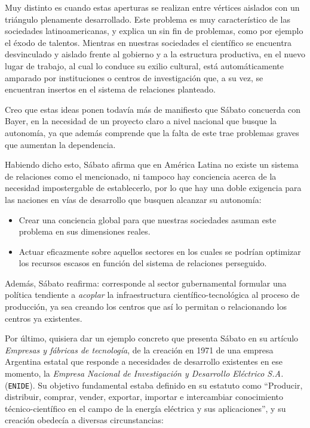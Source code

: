 Muy distinto es cuando estas aperturas se realizan entre vértices aislados con un triángulo plenamente desarrollado. Este problema es muy característico de las sociedades latinoamericanas, y explica un sin fin de problemas, como por ejemplo el éxodo de talentos. Mientras en nuestras sociedades el científico se encuentra desvinculado y aislado frente al gobierno y a la estructura productiva, en el nuevo lugar de trabajo, al cual lo conduce su exilio cultural, está automáticamente amparado por instituciones o centros de investigación que, a su vez, se encuentran insertos en el sistema de relaciones planteado.

Creo que estas ideas ponen todavía más de manifiesto que Sábato concuerda con Bayer, en la necesidad de un proyecto claro a nivel nacional que busque la autonomía, ya que además comprende que la falta de este trae problemas graves que aumentan la dependencia.

\vspace{0.5em}

Habiendo dicho esto, Sábato afirma que en América Latina no existe un sistema de relaciones como el mencionado, ni tampoco hay conciencia acerca de la necesidad impostergable de establecerlo, por lo que hay una doble exigencia para las naciones en vías de desarrollo que busquen alcanzar su autonomía:
\begin{itemize}
    \item Crear una conciencia global para que nuestras sociedades asuman este problema en sus dimensiones reales.
    \item Actuar eficazmente sobre aquellos sectores en los cuales se podrían optimizar los recursos escasos en función del sistema de relaciones perseguido.
\end{itemize}

Además, Sábato reafirma: corresponde al sector gubernamental formular una política tendiente a \textit{acoplar} la infraestructura científico-tecnológica al proceso de producción, ya sea creando los centros que así lo permitan o relacionando los centros ya existentes.

\vspace{0.5em}

Por último, quisiera dar un ejemplo concreto que presenta Sábato en su artículo \textit{Empresas y fábricas de tecnología}, de la creación en 1971 de una empresa Argentina estatal que responde a necesidades de desarrollo existentes en ese momento, la \textit{Empresa Nacional de Investigación y Desarrollo Eléctrico S.A.} (\texttt{ENIDE}). Su objetivo fundamental estaba definido en su estatuto como ``Producir, distribuir, comprar, vender, exportar, importar e intercambiar conocimiento técnico-científico en el campo de la energía eléctrica y sus aplicaciones'', y su creación obedecía a diversas circunstancias:


